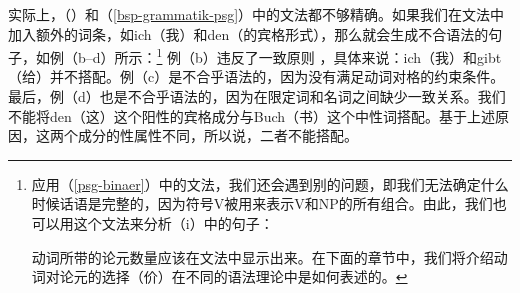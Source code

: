 实际上，（）和（\ref{bsp-grammatik-psg}）中的文法都不够精确。如果我们在文法中加入额外的词条，如ich（我）和den（的宾格形式），那么就会生成不合语法的句子，如例（b--d）所示：\footnote{%
应用（\ref{psg-binaer}）中的文法，我们还会遇到别的问题，即我们无法确定什么时候话语是完整的，因为符号V被用来表示V和NP的所有组合。由此，我们也可以用这个文法来分析（i）中的句子：
  
\eal
{}
\zl
动词所带的论元数量应该在文法中显示出来。在下面的章节中，我们将介绍动词对论元的选择（价）在不同的语法理论中是如何表述的。
}
\eal
{}
\zl
例（b）违反了一致原则 ，具体来说：ich（我）和gibt（给）并不搭配。例（c）是不合乎语法的，因为没有满足动词对格的约束条件。最后，例（d）也是不合乎语法的，因为在限定词和名词之间缺少一致关系。我们不能将den（这）这个阳性的宾格成分与Buch（书）这个中性词搭配。基于上述原因，这两个成分的性属性不同，所以说，二者不能搭配。
